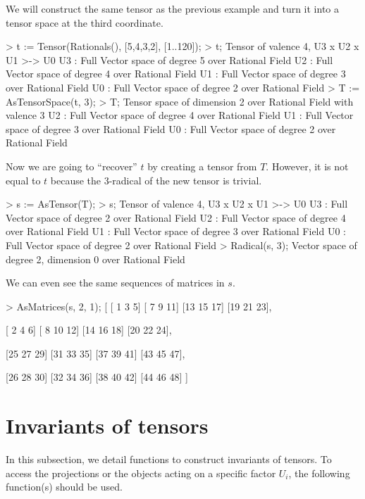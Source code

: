 \begin{example}[SpacesToTensors]

We will construct the same tensor as the previous example and turn it into a tensor space at the third coordinate.
\begin{code}
> t := Tensor(Rationals(), [5,4,3,2], [1..120]);
> t;
Tensor of valence 4, U3 x U2 x U1 >-> U0
U3 : Full Vector space of degree 5 over Rational Field
U2 : Full Vector space of degree 4 over Rational Field
U1 : Full Vector space of degree 3 over Rational Field
U0 : Full Vector space of degree 2 over Rational Field
> T := AsTensorSpace(t, 3);
> T;
Tensor space of dimension 2 over Rational Field with valence 3
U2 : Full Vector space of degree 4 over Rational Field
U1 : Full Vector space of degree 3 over Rational Field
U0 : Full Vector space of degree 2 over Rational Field
\end{code}

Now we are going to ``recover'' $t$ by creating a tensor from $T$.
However, it is not equal to $t$ because the 3-radical of the new tensor is trivial.
\begin{code}
> s := AsTensor(T);
> s;
Tensor of valence 4, U3 x U2 x U1 >-> U0
U3 : Full Vector space of degree 2 over Rational Field
U2 : Full Vector space of degree 4 over Rational Field
U1 : Full Vector space of degree 3 over Rational Field
U0 : Full Vector space of degree 2 over Rational Field
> Radical(s, 3);
Vector space of degree 2, dimension 0 over Rational Field
\end{code}

We can even see the same sequences of matrices in $s$.
\begin{code}
> AsMatrices(s, 2, 1);
[
    [ 1  3  5]
    [ 7  9 11]
    [13 15 17]
    [19 21 23],

    [ 2  4  6]
    [ 8 10 12]
    [14 16 18]
    [20 22 24],

    [25 27 29]
    [31 33 35]
    [37 39 41]
    [43 45 47],

    [26 28 30]
    [32 34 36]
    [38 40 42]
    [44 46 48]
]
\end{code}
\end{example}





\section{Invariants of tensors}

In this subsection, we detail functions to construct invariants of tensors. To
access the projections or the objects acting on a specific factor $U_i$, the
following function(s) should be used.

